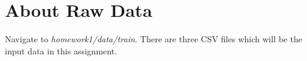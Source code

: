 \documentclass[12pt]{article}
\begin{document}
%
%

\section*{About Raw Data}
Navigate to \textit{homework1/data/train}. There are three CSV files which will be the input data in this assignment. 
\end{document}
